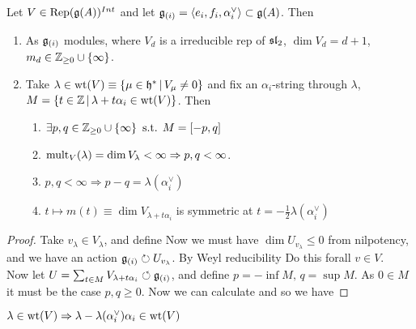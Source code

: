 \documentclass{article}
\begin{document}
\begin{prop}
Let $V \in \Rep(\mf{g}(A))^{Int}$ and let $\mf{g}_{(i)} = \pangle{e_i,f_i,\alpha_i^\vee} \subset \mf{g}(A)$. Then 
\begin{enumerate}
    \item As $\mf{g}_{(i)}$ modules, 
    where $V_d$ is a irreducible rep of $\mf{sl}_2$, $\dim V_d = d+1$, $m_d \in \mbb{Z}_{\geq 0} \cup \pbrace{\infty}$. 
    \item Take $\lambda \in \wt(V) \equiv \pbrace{\mu \in \mf{h}^\ast \, | \, V_\mu \neq 0}$ and fix an $\alpha_i$-string through $\lambda$, $M = \pbrace{t \in \mbb{Z} \, | \, \lambda + t \alpha_i \in \wt(V)}$. Then 
    \begin{enumerate}
        \item $\exists p,q \in \mbb{Z}_{\geq 0} \cup \pbrace{\infty} \text{ s.t. } M = \comm[-p]{q}$ 
        \item $\mult_V(\lambda) = \dim V_\lambda < \infty \Rightarrow p,q < \infty$. 
        \item $p,q < \infty \Rightarrow p-q = \lambda(\alpha_i^\vee)$
        \item $t \mapsto m(t) \equiv \dim V_{\lambda + t\alpha_i}$ is symmetric at $t = - \frac{1}{2} \lambda(\alpha_i^\vee)$
    \end{enumerate}
\end{enumerate}
\end{prop}
\begin{proof}
Take $v_\lambda \in V_\lambda$, and define 
Now we must have $\dim U_{v_\lambda} \leq 0$ from nilpotency, and we have an action $\mf{g}_{(i)} \lact U_{v_\lambda}$. By Weyl reducibility 
Do this forall $v \in V$. \\
Now let $U = \sum_{t \in M} V_{\lambda + t \alpha_i} \ract \mf{g}_{(i)}$, and define $p = - \inf M, \, q = \sup M$. As $0 \in M$ it must be the case $p,q \geq 0$. Now we can calculate 
and so we have 

\end{proof}

\begin{corollary}
$\lambda \in \wt(V) \Rightarrow \lambda - \lambda(\alpha_i^\vee)\alpha_i \in \wt(V)$
\end{corollary}
\end{document}
